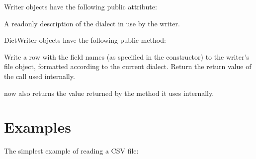 \documentclass[letterpaper,10pt,english]{sphinxmanual}
\begin{document}
Writer objects have the following public attribute:

\vspace{5px}

\begin{fulllineitems}
\label{\detokenize{csv:csv.csvwriter.dialect}}
A read\sphinxhyphen{}only description of the dialect in use by the writer.

\end{fulllineitems}


DictWriter objects have the following public method:

\vspace{5px}

\begin{fulllineitems}
\label{\detokenize{csv:csv.DictWriter.writeheader}}
Write a row with the field names (as specified in the constructor) to
the writer’s file object, formatted according to the current dialect. Return
the return value of the {\hyperref[\detokenize{csv:csv.csvwriter.writerow}]{}} call used internally.


 now also returns the value returned by
the {\hyperref[\detokenize{csv:csv.csvwriter.writerow}]{}} method it uses internally.

\end{fulllineitems}



\section{Examples}
\label{\detokenize{csv:examples}}\label{\detokenize{csv:csv-examples}}
The simplest example of reading a CSV file:
\end{document}
